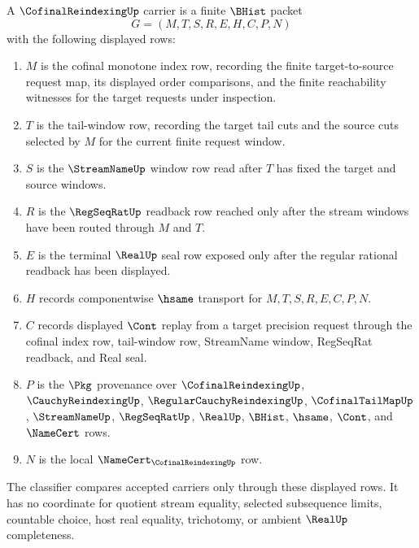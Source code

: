 \begin{definition}
\label{def:cofinal-reindexing-carrier}
A $\CofinalReindexingUp$ carrier is a finite $\BHist$ packet
$$
G=(M,T,S,R,E,H,C,P,N)
$$
with the following displayed rows:
\begin{enumerate}
\item $M$ is the cofinal monotone index row, recording the finite target-to-source request map, its displayed order comparisons, and the finite reachability witnesses for the target requests under inspection.
\item $T$ is the tail-window row, recording the target tail cuts and the source cuts selected by $M$ for the current finite request window.
\item $S$ is the $\StreamNameUp$ window row read after $T$ has fixed the target and source windows.
\item $R$ is the $\RegSeqRatUp$ readback row reached only after the stream windows have been routed through $M$ and $T$.
\item $E$ is the terminal $\RealUp$ seal row exposed only after the regular rational readback has been displayed.
\item $H$ records componentwise $\hsame$ transport for $M,T,S,R,E,C,P,N$.
\item $C$ records displayed $\Cont$ replay from a target precision request through the cofinal index row, tail-window row, StreamName window, RegSeqRat readback, and Real seal.
\item $P$ is the $\Pkg$ provenance over $\CofinalReindexingUp$, $\CauchyReindexingUp$, $\RegularCauchyReindexingUp$, $\CofinalTailMapUp$, $\StreamNameUp$, $\RegSeqRatUp$, $\RealUp$, $\BHist$, $\hsame$, $\Cont$, and $\NameCert$ rows.
\item $N$ is the local $\NameCert_{\CofinalReindexingUp}$ row.
\end{enumerate}
The classifier compares accepted carriers only through these displayed rows. It has no coordinate for quotient stream equality, selected subsequence limits, countable choice, host real equality, trichotomy, or ambient $\RealUp$ completeness.
\end{definition}

